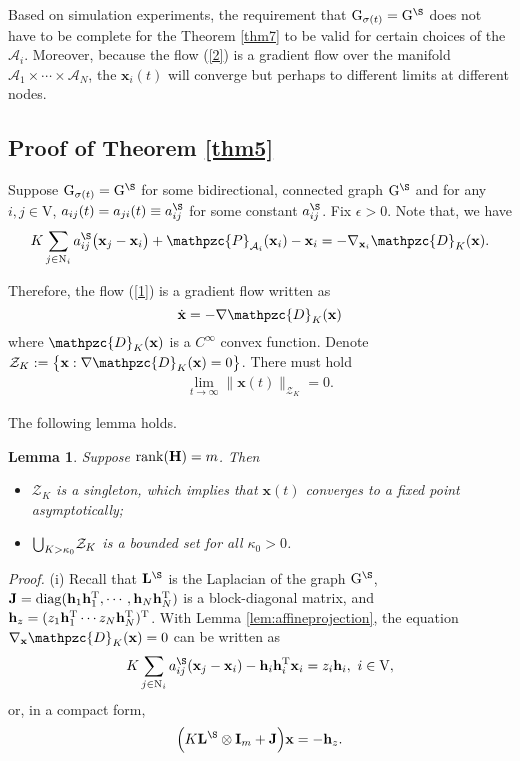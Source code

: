 \documentclass[a4paper, 11pt]{article}
\newcommand*\mcup{\mathbin{\mathpalette\mcupinn\relax}}
\newcommand*\mcupinn[2]{\vcenter{\hbox{$\mathsurround=0pt
  \ifx\displaystyle#1\textstyle\else#1\fi\bigcup$}}}
\def\T{^{\rm\tiny T}}
\newtheorem{lemma}{Lemma}
\begin{document}
 Based on simulation experiments,  the requirement that $\mathrm{G}_{\sigma(t)}=\mathrm{G}^\S$  does not have to be complete for the Theorem \ref{thm7} to be valid for certain choices of the $\mathcal{A}_i$. Moreover, because the flow (\ref{2}) is a gradient flow over the manifold $\mathcal{A}_1\times\cdots \times \mathcal{A}_N$, the $\mathbf{x}_i(t)$ will converge but perhaps to different limits at different nodes.
\subsection{Proof of Theorem \ref{thm5}}
 Suppose $\mathrm{G}_{\sigma(t)}=\mathrm{G}^\S$ for some bidirectional, connected graph $\mathrm{G}^\S$ and for any $i,j\in\mathrm{V}$, $a_{ij}(t)=a_{ji}(t)\equiv a_{ij}^\S$ for some constant $a_{ij}^\S$.  Fix $\epsilon>0$. Note that, we have
\begin{align}
K\sum\limits_{j \in
\mathrm{N}_i}a_{ij}^\S\big(\mathbf{x}_j-\mathbf{x}_i\big)+\mathpzc{P}_{\mathcal{A}_i}(\mathbf{x}_i)-\mathbf{x}_i=-\nabla_{\mathbf{x}_i} \mathpzc{D}_K(\mathbf{x}).
\end{align}

 Therefore, the flow (\ref{1}) is a gradient flow written as
$$
\dot{\mathbf{x}}= -\nabla \mathpzc{D}_K(\mathbf{x})
$$
where  $\mathpzc{D}_K(\mathbf{x})$ is a $C^{\infty}$ convex function.  Denote $
\mathcal{Z}_K:= \big\{\mathbf{x}: \nabla  \mathpzc{D}_K(\mathbf{x})=0 \big\}$. There must hold
\begin{align}\label{99}
\lim_{t\rightarrow \infty}\big\|\mathbf{x}(t)\big\|_{\mathcal{Z}_K}=0.
\end{align}




The following lemma holds.

\begin{lemma}
Suppose ${\rm rank}{(\mathbf{H})}=m$. Then  \begin{itemize}
\item[(i)] $\mathcal{Z}_K$ is a singleton, which implies that $\mathbf{x}(t)$ converges to a fixed point asymptotically;
\item[(ii)] $\mcup_{K>{\kappa_0}} \mathcal{Z}_K$ is a bounded set for all ${\kappa_0}>0$.
\end{itemize}
\end{lemma}
{\it Proof.} (i) Recall that $\mathbf{L}^\S$ is the Laplacian of the graph $\mathrm{G}^\S$,  $\mathbf{J}={\rm diag} (\mathbf{h}_1\mathbf{h}\T_1, \cdots, \mathbf{h}_N\mathbf{h}\T_N)$  is a block-diagonal matrix, and $\mathbf{h}_z=(z_1\mathbf{h}_1\T \cdots z_N \mathbf{h}_N\T)\T$. With Lemma \ref{lem:affineprojection},  the equation $\nabla_{\mathbf{x}} \mathpzc{D}_K(\mathbf{x})=0$ can be written as
\begin{align}\label{200}
K\sum_{j\in \mathrm{N}_i} a_{ij}^\S(\mathbf{x}_j -\mathbf{x}_i)-\mathbf{h}_i\mathbf{h}\T_i \mathbf{x}_i =z_i \mathbf{h}_i,\ i\in\mathrm{V},
\end{align}
or, in a compact form,
\begin{align}
\Big(K \mathbf{L}^\S\otimes \mathbf{I}_m +\mathbf{J}\Big) \mathbf{x}=-{\mathbf{h}_z}.
\end{align}
\end{document}
